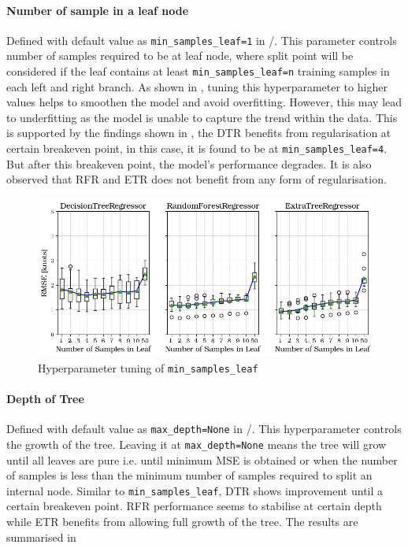 \paragraph{Number of sample in a leaf node}\label{min_samples_leaf}

Defined with default value as {\tt min\_samples\_leaf=1} in \scikit/. This parameter controls number of samples required to be at leaf node, where split point will be considered if the leaf contains at least {\tt min\_samples\_leaf=n} training samples in each left and right branch. As shown in , tuning this hyperparameter to higher values helps to smoothen the model and avoid overfitting. However, this may lead to underfitting as the model is unable to capture the trend within the data. This is supported by the findings shown in , the DTR benefits from regularisation at certain breakeven point, in this case, it is found to be at {\tt min\_samples\_leaf=4}. But after this breakeven point, the model's performance degrades. It is also observed that RFR and ETR does not benefit from any form of regularisation.  

\begin{figure}[h]
    \centering
        \includegraphics[width=.85\textwidth]{02_figures/hpo_min_samples_leaf.png}
        \caption{Hyperparameter tuning of {\tt min\_samples\_leaf}}
        \label{fig:hpo_min_samples_leaf}
\end{figure}

\paragraph{Depth of Tree}\label{max_depth}

Defined with default value as {\tt max\_depth=None} in \scikit/. This hyperparameter controls the growth of the tree. Leaving it at {\tt max\_depth=None} means the tree will grow until all leaves are pure i.e. until minimum MSE is obtained or when the number of samples is less than the minimum number of samples required to split an internal node. Similar to {\tt min\_samples\_leaf}, DTR shows improvement until a certain breakeven point. RFR performance seems to stabilise at certain depth while ETR benefits from allowing full growth of the tree. The results are summarised in   

